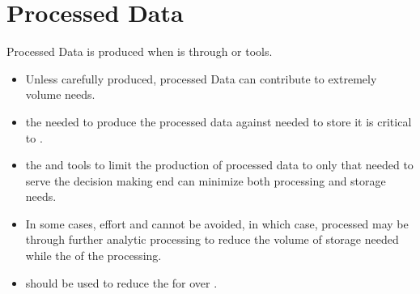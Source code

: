 \documentclass[letterpaper,10pt,english]{sphinxmanual}
\begin{document}
\section{Processed Data}
\label{\detokenize{requirements/data/processed:processed-data}}\label{\detokenize{requirements/data/processed::doc}}
\sphinxAtStartPar
Processed Data is produced when  is  through
 or  tools.
\begin{itemize}
\item {} 
\sphinxAtStartPar
Unless carefully produced, processed Data can contribute to extremely  volume needs.

\item {} 
\sphinxAtStartPar
{} the  needed to produce the processed data against  needed to store it is critical to .

\item {} 
\sphinxAtStartPar
{} the  and  tools to limit the production of processed data to only that needed to serve the decision making end can minimize both processing and storage needs.

\item {} 
\sphinxAtStartPar
In some cases,  effort and  cannot be avoided, in which case, processed may be  through further analytic processing to reduce the volume of storage needed while  the  of the processing.

\item {} 
\sphinxAtStartPar
{} should be used to reduce the  for  over .

\end{itemize}
\end{document}
